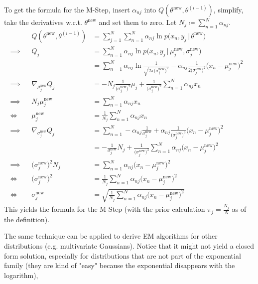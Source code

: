 \documentclass[a4paper, 11pt, accentcolor = tud3b]{tudreport}
\newcommand{\given}{\ensuremath{\,\vert\,}}
\begin{document}
						To get the formula for the M-Step, insert \( \alpha_{nj} \) into \( Q(\theta^\textrm{new}, \theta^{(i - 1)}) \), simplify, take the derivatives w.r.t. \(\theta^\textrm{new}\) and set them to zero. Let \( N_j \coloneqq \sum_{n = 1}^{N} \alpha_{nj} \).
						\begin{align}
							&& Q(\theta^\textrm{new}, \theta^{(i - 1)}) &= \sum_{j = 1}^{N} \sum_{n = 1}^{N} \alpha_{nj} \ln p\big(x_n, y_j \given \theta^\textrm{new}\big) & \\
							\implies && Q_j &= \sum_{n = 1}^{N} \alpha_{nj} \ln p\big(x_n, y_j \given \mu_j^\textrm{new}, \sigma_j^\textrm{new}\big) & \\
							&& &= \sum_{n = 1}^{N} \alpha_{nj} \ln \frac{1}{\sqrt{2\pi\big(\sigma_j^\textrm{new}\big)^2}} - \alpha_{nj} \frac{1}{2\big(\sigma_j^\textrm{new}\big)^2} \big(x_n - \mu_j^\textrm{new}\big)^2 & \\
							\implies && \nabla_{\mu_j^\textrm{new}} Q_j &= -N_j\frac{1}{\big(\sigma_j^\textrm{new}\big)^2}\mu_j + \frac{1}{\big(\sigma_j^\textrm{new}\big)^2} \sum_{n = 1}^{N} \alpha_{nj} x_n & \\
							\implies && N_j\mu_j^\textrm{new} &= \sum_{n = 1}^{N} \alpha_{nj} x_n & \\
							\iff && \mu_j^\textrm{new} &= \frac{1}{N_j} \sum_{n = 1}^{N} \alpha_{nj} x_n & \\
							\implies && \nabla_{\sigma_j^\textrm{new}} Q_j &= \sum_{n = 1}^{N} -\alpha_{nj} \frac{1}{\sigma_j^\textrm{new}} + \alpha_{nj} \frac{1}{\big(\sigma_j^\textrm{new}\big)^3} \big(x_n - \mu_j^\textrm{new}\big)^2 & \\
							&& &= -\frac{1}{\sigma_j^\textrm{new}} N_j + \frac{1}{\big(\sigma_j^\textrm{new}\big)^3} \sum_{n = 1}^{N} \alpha_{nj} \big(x_n - \mu_j^\textrm{new}\big)^2 & \\
							\implies && \big(\sigma_j^\textrm{new}\big)^2 N_j &= \sum_{n = 1}^{N} \alpha_{nj} \big(x_n - \mu_j^\textrm{new}\big)^2 & \\
							\iff && \big(\sigma_j^\textrm{new}\big)^2 &= \frac{1}{N_j} \sum_{n = 1}^{N} \alpha_{nj} \big(x_n - \mu_j^\textrm{new}\big)^2 & \\
							\iff && \sigma_j^\textrm{new} &= \sqrt{\frac{1}{N_j} \sum_{n = 1}^{N} \alpha_{nj} \big(x_n - \mu_j^\textrm{new}\big)^2}
						\end{align}
						This yields the formula for the M-Step (with the prior calculation \( \pi_j = \frac{N_j}{N} \) as of the definition).

						The same technique can be applied to derive EM algorithms for other distributions (e.g. multivariate Gaussians). Notice that it might not yield a closed form solution, especially for distributions that are not part of the exponential family (they are kind of "easy" because the exponential disappears with the logarithm),
\end{document}
